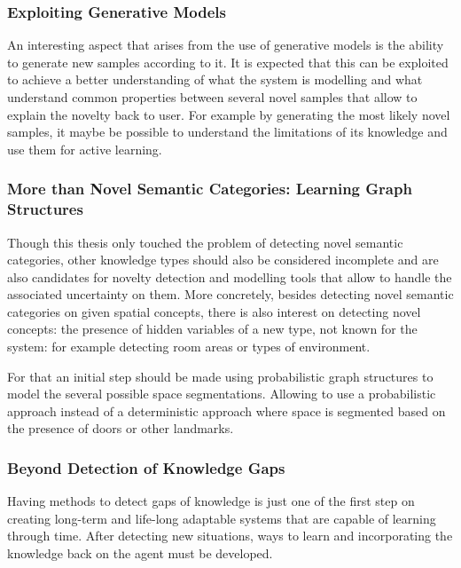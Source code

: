 \subsubsection*{Exploiting Generative Models}
An interesting aspect that arises from the use of generative models is the ability to generate new
samples according to it. It is expected that this can be exploited to achieve a better understanding
of what the system is modelling and what understand common properties between several novel samples
that allow to explain the novelty back to user. For example by generating the most
likely novel samples, it maybe be possible to understand the limitations of its
knowledge and use them for active learning.

\subsubsection*{More than Novel Semantic Categories: Learning Graph Structures}
Though this thesis only touched the problem of detecting novel semantic categories, other knowledge
types should also be considered incomplete and are also candidates for novelty detection and
modelling tools that allow to handle the associated uncertainty on them.
More concretely, besides detecting novel semantic categories on given spatial concepts, there is
also interest on detecting novel concepts: the presence of hidden variables of a new type, not known
for the system: for example detecting room areas or types of environment.

For that an initial step should be made using probabilistic graph structures to model the several
possible space segmentations. Allowing to use a probabilistic approach instead of a deterministic
approach where space is segmented based on the presence of doors or other landmarks.

\subsubsection*{Beyond Detection of Knowledge Gaps}
Having methods to detect gaps of knowledge is just one of the first step on creating long-term and
life-long adaptable systems that are capable of learning through time. After detecting new
situations, ways to learn and incorporating the knowledge back on the agent must be developed.

